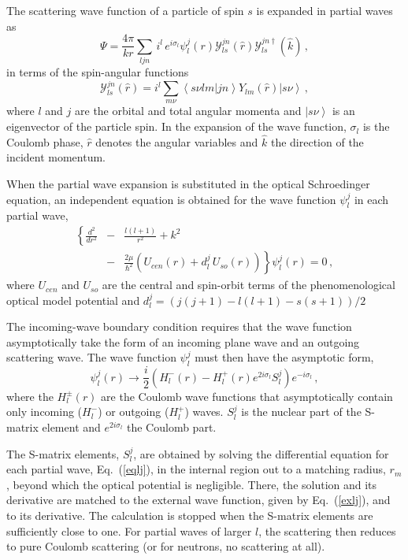 \documentclass[twocolumn,amsmath,amssymb,10pt,groupedaddress,letter]{revtex4}
\begin{document}
The scattering wave function of a particle of spin $s$ is expanded in
partial waves as \begin{equation}
\Psi=\frac{4\pi}{kr}\sum_{ljn}\, i^{l}\, e^{i\sigma_{l}}\psi_{l}^{j}(r){\mathcal{Y}}_{ls}^{jn}(\hat{r}){\mathcal{Y}}_{ls}^{jn\dagger}(\hat{k})\,,\label{parwav}\end{equation}
 in terms of the spin-angular functions \begin{equation}
{\mathcal{Y}}_{ls}^{jn}(\hat{r})=i^{l}\sum_{m\nu}\left\langle s\nu
lm|jn\right\rangle Y_{lm}(\hat{r})\left|s\nu\right\rangle \,,\end{equation}
 where $l$ and $j$ are the orbital and total angular momenta and
$\left|s\nu\right\rangle $ is an eigenvector of the particle spin.
In the expansion of the wave function, $\sigma_{l}$ is the Coulomb
phase, $\hat{r}$ denotes the angular variables and $\hat{k}$ the
direction of the incident momentum.

When the partial wave expansion is substituted in the optical Schroedinger
equation, an independent equation is obtained for the wave function
$\psi_{l}^{j}$ in each partial wave, \begin{eqnarray}
\left\{ \frac{d^{2}}{dr^{2}}\right. & - & \frac{l(l+1)}{r^{2}}+k^{2}\label{eqlj}\\
 & - & \left.\frac{2\mu}{\hbar^{2}}\left(U_{cen}(r)+d_{l}^{j}\, U_{so}(r)\right)\right\} \psi_{l}^{j}(r)=0\,,\nonumber\end{eqnarray}
 where $U_{cen}$ and $U_{so}$ are the central and spin-orbit terms
of the phenomenological optical model potential and $d_{l}^{j}=(j(j+1)-l(l+1)-s(s+1))/2$

The incoming-wave boundary condition requires that the wave function
asymptotically take the form of an incoming plane wave and an outgoing
scattering wave. The wave function $\psi_{l}^{j}$ must then have
the asymptotic form, \begin{equation}
\psi_{l}^{j}(r)\rightarrow\frac{i}{2}\left(H_{l}^{-}(r)-H_{l}^{+}(r)e^{2i\sigma_{l}}S_{l}^{j}\right)e^{-i\sigma_{l}}\,,\label{exlj}\end{equation}
 where the $H_{l}^{\pm}(r)$ are the
Coulomb wave functions that asymptotically contain only incoming ($H_{l}^{-}$)
or outgoing ($H_{l}^{+}$) waves. $S_{l}^{j}$ is the nuclear part
of the S-matrix element and $e^{2i\sigma_{l}}$ the Coulomb part.

The S-matrix elements, $S_{l}^{j}$, are obtained by solving the differential
equation for each partial wave, Eq.~(\ref{eqlj}), in the internal
region out to a matching radius, $r_{m}$, beyond which the optical
potential is negligible. There, the solution and its derivative are
matched to the external wave function, given by Eq.~(\ref{exlj}),
and to its derivative. The calculation is stopped when the S-matrix
elements are sufficiently close to one. For partial waves of larger
$l$, the scattering then reduces to pure Coulomb scattering (or for
neutrons, no scattering at all).
\end{document}
